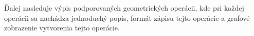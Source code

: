 
Ďalej nasleduje výpis podporovaných geometrických operácii, kde pri každej operácii sa nachádza jednoduchý popis, formát zápisu tejto operácie a grafové zobrazenie vytvorenia tejto operácie.






